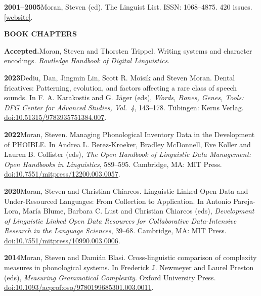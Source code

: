 \documentclass[11pt]{article}
\newcommand{\hangpara}{
 \setlength{\parindent}{0in} %
 \hangindent=0.42in %
}
\begin{document}
\vskip 6pt
\hangpara
{\bf 2001--2005}\hspace{1ex}Moran, Steven (ed). The Linguist List. ISSN: 1068--4875. 420 issues. \href{https://linguistlist.org}{[website]}.


\vskip 20pt
\begin{flushleft}
{\bf BOOK CHAPTERS}
\end{flushleft}

\hangpara
{\bf Accepted.}\hspace{1ex}Moran, Steven and Thorsten Trippel. Writing systems and character encodings. \textit{Routledge Handbook of Digital Linguistics}.

\vskip 6pt
\hangpara
{\bf 2023}\hspace{1ex}Dediu, Dan, Jingmin Lin, Scott R. Moisik and Steven Moran. Dental fricatives: Patterning, evolution, and factors affecting a rare class of speech sounds. In F. A. Karakostis and G. Jäger (eds), \textit{Words, Bones, Genes, Tools: DFG Center for Advanced Studies, Vol.\ 4}, 143--178. Tübingen: Kerns Verlag. \href{https://doi.org/10.51315/9783935751384.007}{doi:10.51315/9783935751384.007}. %

\vskip 6pt
\hangpara
{\bf 2022}\hspace{1ex}Moran, Steven. Managing Phonological Inventory Data in the Development of PHOIBLE. In Andrea L. Berez-Kroeker, Bradley McDonnell, Eve Koller and Lauren B. Collister (eds), \textit{The Open Handbook of Linguistic Data Management: Open Handbooks in Linguistics}, 589--595. Cambridge, MA: MIT Press. \href{https://doi.org/10.7551/mitpress/12200.003.0057}{doi:10.7551/mitpress/12200.003.0057}.

\vskip 6pt
\hangpara
{\bf 2020}\hspace{1ex}Moran, Steven and Christian Chiarcos. Linguistic Linked Open Data and Under-Resourced Languages: From Collection to Application. In Antonio Pareja-Lora, María Blume, Barbara C. Lust and Christian Chiarcos (eds), \textit{Development of Linguistic Linked Open Data Resources for Collaborative Data-Intensive Research in the Language Sciences}, 39--68. Cambridge, MA: MIT Press. \href{https://doi.org/10.7551/mitpress/10990.003.0006}{doi:10.7551/mitpress/10990.003.0006}.


\vskip 6pt
\hangpara
{\bf 2014}\hspace{1ex}Moran, Steven and Dami{\'a}n Blasi. Cross-linguistic comparison of complexity measures in phonological systems. In Frederick J. Newmeyer and Laurel Preston (eds), {\it Measuring Grammatical Complexity}. Oxford University Press. \href{https://doi.org/10.1093/acprof:oso/9780199685301.003.0011}{doi:10.1093/acprof:oso/9780199685301.003.0011}.
\end{document}
